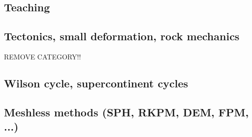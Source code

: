 \subsection{Teaching} 

{\scriptsize
\cite{grap11}
\cite{kerh14}
\cite{bemg19}
}
\subsection{Tectonics, small deformation, rock mechanics}
REMOVE CATEGORY!!
{\scriptsize
\noindent
\cite{ilma93}
\cite{hept96}
}

\subsection{Wilson cycle, supercontinent cycles}

{\scriptsize
\noindent
\cite{trry95}
\cite{evan03}
\cite{zhzl07}\cite{copb07}\cite{phbu07}
\cite{zhzm09}\cite{onlj09}
\cite{lemj11}\cite{burk11}
\cite{buto14}\cite{helo14}\cite{roct14}
\cite{woda17}
\cite{begb19}\cite{wihb19}\cite{huzl19}
}

\subsection{Meshless methods (SPH, RKPM, DEM, FPM, ...)}

{\scriptsize
\noindent
\cite{lucy77}
\cite{beko96}
\cite{mofz97}
\cite{zhfm99}
\cite{begl00}\cite{lihl00}
\cite{idso01}
\cite{lilr02}\cite{lill02}\cite{lili02}
\cite{lill03}\cite{mamo03}
\cite{wali04}\cite{hufl04}
\cite{febh05}\cite{lixl05}\cite{thes05}\cite{thje05a}\cite{thje05b}
\cite{lili06}\cite{yabm06}
\cite{busf07}
\cite{bufs08}\cite{lemx08}
\cite{dacl10}
\cite{prcl11}\cite{kukg11}\cite{kadm11}\cite{szpt11}\cite{howt11}
\cite{szpm12}
\cite{koau13}\cite{viau13}
\cite{dazs14}\cite{lekb14}
\cite{nifs15}
\cite{krrk18}
\cite{meho19}\cite{meho19b}
}

